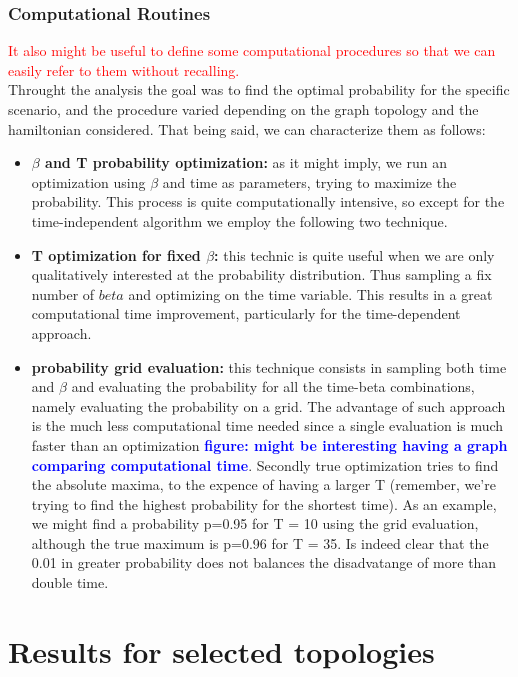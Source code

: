 \documentclass[aps,pra,reprint, onecolumn, showkeys]{revtex4-2}
\newcommand{\red}[1]{\textcolor{red}{#1}}
\newcommand{\blue}[1]{\textcolor{blue}{\textbf{figure: #1}}}
\begin{document}
\subsubsection{Computational Routines}
\red{It also might be useful to define some computational procedures so that we can easily refer to them without recalling.} \\ Throught the analysis the goal was to find the optimal probability for the specific scenario, and the procedure varied depending on the graph topology and the hamiltonian considered. That being said, we can characterize them as follows:
\begin{itemize}
  \item \textbf{$\beta$ and T probability optimization:} as it might imply, we run an optimization using $\beta$ and time as parameters, trying to maximize the probability. This process is quite computationally intensive, so except for the time-independent algorithm we employ the following two technique.
  \item \textbf{T optimization for fixed $\beta$:} this technic is quite useful when we are only qualitatively interested at the probability distribution. Thus sampling a fix number of $beta$ and optimizing on the time variable. This results in a great computational time improvement, particularly for the time-dependent approach.
  \item \textbf{probability grid evaluation:} this technique consists in sampling both time and $\beta$ and evaluating the probability for all the time-beta combinations, namely evaluating the probability on a grid. The advantage of such approach is the much less computational time needed since a single evaluation is much faster than an optimization \blue{might be interesting having a graph comparing computational time}. Secondly true optimization tries to find the absolute maxima, to the expence of having a larger T (remember, we're trying to find the highest probability for the shortest time). As an example, we might find a probability p=0.95 for T = 10 using the grid evaluation, although the true maximum is p=0.96 for T = 35. Is indeed clear that the 0.01 in greater probability does not balances the disadvatange of more than double time.
\end{itemize}

\section{Results for selected topologies}
\end{document}
